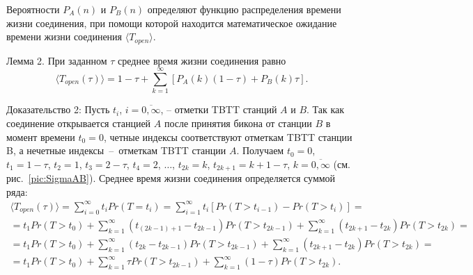 Вероятности  $P_A(n)$ и $P_B(n)$ определяют функцию распределения времени жизни соединения, при помощи которой находится математическое ожидание времени жизни соединения $\langle T_{open} \rangle$.

Лемма 2. 
При заданном  $\tau$ среднее время жизни соединения равно
\begin{equation}
\label{eq:math:T_open_2}
\langle T_{open}(\tau) \rangle = 1-\tau + \sum \limits^{\infty}_{k=1} \left[ P_A(k) (1-\tau) +  P_B(k) \tau \right].
\end{equation}

Доказательство 2:
Пусть $t_i$, $ i = \overline{0,\infty}$, --  отметки TBTT станций $A$ и $B$. Так как соединение открывается станцией $A$ после принятия бикона от станции $B$ в момент времени $t_0=0$, четные индексы соответствуют отметкам TBTT станции B, а нечетные индексы~--~отметкам TBTT станции $A$. Получаем $t_0 = 0$, $t_1 = 1-\tau$, $t_2 = 1$, $t_3 = 2-\tau$, $t_4 = 2$, $\ldots$, $t_{2k} = k$, $t_{2k+1} = k+1-\tau$, $k = \overline{0,\infty}$ (см. рис.~\ref{pic:SigmaAB}). Среднее время жизни соединения определяется суммой ряда:
\begin{equation}
\begin{array}{c}
\langle T_{open} (\tau)\rangle = \sum \limits_{i=0}^{\infty} t_i Pr(T = t_i)	
=  \sum \limits_{i=1}^{\infty} t_i \left[ Pr(T > t_{i-1}) - Pr (T>t_i) \right] =\\
= t_1 Pr(T > t_0) + \sum \limits_{k=1}^{\infty} (t_{(2k-1)+1} - t_{2k-1})Pr(T>t_{2k-1})
+ \sum \limits_{k=1}^{\infty} (t_{2k+1} - t_{2k})Pr(T>t_{2k}) = \\
= t_1 Pr(T > t_0) + \sum \limits_{k=1}^{\infty} (t_{2k} - t_{2k-1})Pr(T>t_{2k-1}) 
+ \sum \limits_{k=1}^{\infty} (t_{2k+1} - t_{2k})Pr(T>t_{2k}) =  \\
= t_1 Pr(T > t_0) + \sum \limits_{k=1}^{\infty} \tau Pr(T>t_{2k-1}) + \sum \limits_{k=1}^{\infty} (1-\tau)Pr(T>t_{2k}).
\end{array}
\label{eq:math:T_open_1_lem-2}
\end{equation}
